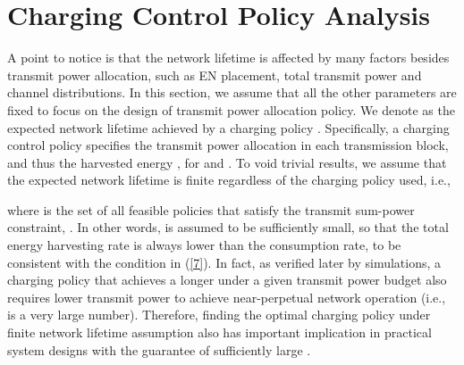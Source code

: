 \documentclass[conference]{IEEEtran}
\begin{document}
\section{Charging Control Policy Analysis}
A point to notice is that the network lifetime is affected by many factors besides transmit power allocation, such as EN placement, total transmit power and channel distributions. In this section, we assume that all the other parameters are fixed to focus on the design of transmit power allocation policy. We denote  as the expected network lifetime achieved by a charging policy . Specifically, a charging control policy  specifies the transmit power allocation in each transmission block, and thus the harvested energy , for  and . To void trivial results, we assume that the expected network lifetime is finite regardless of the charging policy used, i.e.,

where  is the set of all feasible policies that satisfy the transmit sum-power constraint, . In other words,  is assumed to be sufficiently small, so that the total energy harvesting rate is always lower than the consumption rate, to be consistent with the condition in (\ref{7}). In fact, as verified later by simulations, a charging policy  that achieves a longer  under a given transmit power budget also requires lower transmit power to achieve near-perpetual network operation (i.e.,  is a very large number). Therefore, finding the optimal charging policy under finite network lifetime assumption also has important implication in practical system designs with the guarantee of sufficiently large .
\end{document}
